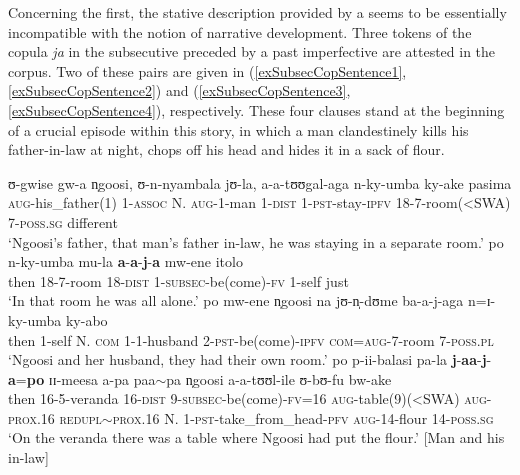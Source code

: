 Concerning the first, the stative description provided by a  seems to be essentially incompatible with the notion of narrative development. Three tokens of the copula \textit{ja} in the subsecutive preceded by a past imperfective are attested in the corpus. Two of these pairs are given in (\ref{exSubsecCopSentence1}, \ref{exSubsecCopSentence2}) and (\ref{exSubsecCopSentence3}, \ref{exSubsecCopSentence4}), respectively. These four clauses stand at the beginning of a crucial episode within this story, in which a man clandestinely kills his father-in-law at night, chops off his head and hides it in a sack of flour.

\begin{exe}
\ex\label{exSubsecCop} \begin{xlist}
\ex\label{exSubsecCopSentence1}\gll ʊ-gwise gw-a n̩goosi, ʊ-n-nyambala jʊ-la, a-a-tʊʊgal-aga n-ky-umba ky-ake pasima\\
\textsc{aug}-his\_father(1) 1-\textsc{assoc} N. \textsc{aug}-1-man 1-\textsc{dist} 1-\textsc{pst}-stay-\textsc{ipfv} 18-7-room(<SWA) 7-\textsc{poss.sg} different\\
\glt `Ngoosi's father, that man's father in-law, he was staying in a separate room.'
\ex\label{exSubsecCopSentence2}\gll po n-ky-umba mu-la \textbf{a}-\textbf{a}-\textbf{j}-\textbf{a} mw-ene itolo\\
then 18-7-room 18-\textsc{dist} 1-\textsc{subsec}-be(come)-\textsc{fv} 1-self just\\
\glt `In that room he was all alone.'
\ex \label{exSubsecCopSentence3}\gll po mw-ene n̩goosi na jʊ-n̩-dʊme ba-a-j-aga n=ɪ-ky-umba ky-abo\\
then 1-self N. \textsc{com} 1-1-husband 2-\textsc{pst}-be(come)-\textsc{ipfv} \textsc{com}=\textsc{aug}-7-room 7-\textsc{poss.pl}\\
\glt `Ngoosi and her husband, they had their own room.'
\ex\label{exSubsecCopSentence4}\gll po p-ii-balasi pa-la \textbf{j}-\textbf{aa}-\textbf{j}-\textbf{a}=\textbf{po} ɪɪ-meesa a-pa paa$\sim$pa n̩goosi a-a-tʊʊl-ile ʊ-bʊ-fu bw-ake\\
then 16-5-veranda 16-\textsc{dist} 9-\textsc{subsec}-be(come)-\textsc{fv}=16 \textsc{aug}-table(9)(<SWA) \textsc{aug}-\textsc{prox.16} \textsc{redupl}$\sim$\textsc{prox.16} N. 1-\textsc{pst}-take\_from\_head-\textsc{pfv} \textsc{aug}-14-flour 14-\textsc{poss.sg}\\
\glt `On the veranda there was a table where Ngoosi had put the flour.' [Man and his in-law]
\end{xlist}
\end{exe}

